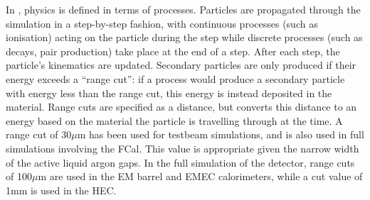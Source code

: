 

In \geant, physics is defined in terms of processes. Particles are propagated through the simulation in a step-by-step fashion, with continuous processes (such as ionisation) acting on the particle during the step while discrete processes (such as decays, pair production) take place at the end of a step. After each step, the particle's kinematics are updated. Secondary particles are only produced if their energy exceeds a ``range cut'': if a process would produce a secondary particle with energy less than the range cut, this energy is instead deposited in the material. Range cuts are specified as a distance, but \geant converts this distance to an energy based on the material the particle is travelling through at the time. A range cut of $30 \mu$m has been used for testbeam simulations, and is also used in full \atlas simulations involving the FCal. This value is appropriate given the narrow width of the active liquid argon gaps. In the full simulation of the \atlas detector, range cuts of 100$\mu$m are used in the EM barrel and EMEC calorimeters, while a cut value of 1mm is used in the HEC. 

%
%

